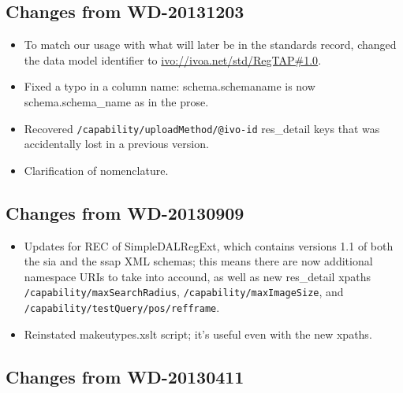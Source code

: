 \documentclass[11pt,a4paper]{ivoa}
\begin{document}
\subsection{Changes from WD-20131203}

\label{changes-20131203}


\begin{itemize}

\item To match our usage with what will later be in the standards
  record, changed the data model identifier to
  \url{ivo://ivoa.net/std/RegTAP\#1.0}.

\item Fixed a typo in a column name: schema.schemaname is now schema.schema\_name
  as in the prose.{}

\item Recovered 
  \texttt{/capability/uploadMethod/@ivo-id} res\_detail keys that was
  accidentally lost in a previous version.{}

\item Clarification of nomenclature.{}

\end{itemize}

\subsection{Changes from WD-20130909}

\label{changes-20130909}


\begin{itemize}

\item Updates for REC of SimpleDALRegExt, which contains versions 1.1 of
  both the sia and the ssap XML schemas; this means there are now additional
  namespace URIs to take into accound, as well as new res\_detail xpaths
  \texttt{/capability/maxSearchRadius}, 
  \texttt{/capability/maxImageSize}, and 
  \texttt{/capability/testQuery/pos/refframe}.{}

\item Reinstated makeutypes.xslt script; it's useful even with the new
  xpaths.{}

\end{itemize}

\subsection{Changes from WD-20130411}

\label{changes-20130411}
\end{document}
